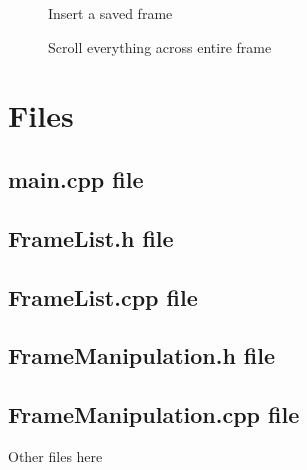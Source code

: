 \documentclass[11pt]{article} %
\begin{document}
\begin{figure}[H]
	\centering
	\caption{Insert a saved frame}
	\label{fig:UC13}
\end{figure}

\begin{figure}[H]
	\centering
	\caption{Scroll everything across entire frame}
	\label{fig:UC14}
\end{figure}

  
\newpage
\section{Files}
\subsection{main.cpp file}


\newpage
\subsection{FrameList.h file}

\newpage
\subsection{FrameList.cpp file}


\newpage
\subsection{FrameManipulation.h file}

\newpage
\subsection{FrameManipulation.cpp file}


\newpage
 Other files here
\end{document}
